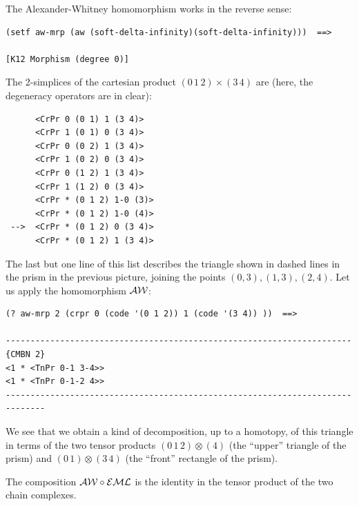 The Alexander-Whitney homomorphism works in the reverse sense:
{\footnotesize\begin{verbatim}
(setf aw-mrp (aw (soft-delta-infinity)(soft-delta-infinity)))  ==>

[K12 Morphism (degree 0)]
\end{verbatim}}
The 2-simplices of the cartesian product $(0\, 1\, 2) \times (3\, 4)$ are (here, the degeneracy
operators are in clear):
{\footnotesize\begin{verbatim}
      <CrPr 0 (0 1) 1 (3 4)>
      <CrPr 1 (0 1) 0 (3 4)>
      <CrPr 0 (0 2) 1 (3 4)>
      <CrPr 1 (0 2) 0 (3 4)>
      <CrPr 0 (1 2) 1 (3 4)>
      <CrPr 1 (1 2) 0 (3 4)>
      <CrPr * (0 1 2) 1-0 (3)>
      <CrPr * (0 1 2) 1-0 (4)>
 -->  <CrPr * (0 1 2) 0 (3 4)>
      <CrPr * (0 1 2) 1 (3 4)>
\end{verbatim}}
The last but one line of this list describes the triangle shown in dashed lines in the prism
in the previous picture, joining the points $(0,3), (1,3), (2,4)$. 
Let us apply  the homomorphism $\cal AW$:
{\footnotesize\begin{verbatim}
(? aw-mrp 2 (crpr 0 (code '(0 1 2)) 1 (code '(3 4)) ))  ==>

----------------------------------------------------------------------{CMBN 2}
<1 * <TnPr 0-1 3-4>>
<1 * <TnPr 0-1-2 4>>
------------------------------------------------------------------------------
\end{verbatim}}
We see that we obtain  a kind of decomposition, up to a homotopy, of this triangle
in terms of the two tensor products $(0\, 1\, 2) \otimes (4)$ (the ``upper'' triangle of
the prism) and $(0\,1) \otimes (3\, 4)$ (the ``front'' rectangle of the prism).
\par
\medskip
The composition ${\cal AW} \circ {\cal EML}$ is the identity in the tensor product of
the two chain complexes.
